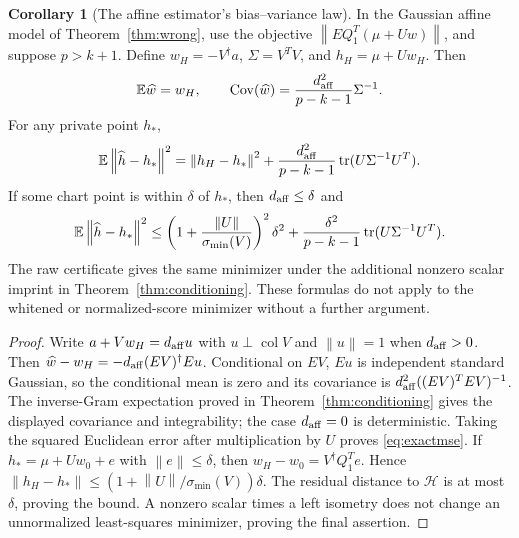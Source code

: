 \documentclass[11pt,a4paper]{article}
\theoremstyle{definition}
\newtheorem{corollary}[theorem]{Corollary}
\theoremstyle{definition}
\theoremstyle{remark}\newtheorem{remark}[theorem]{Remark}
\newcommand{\HH}{\mathcal H}\newcommand{\XX}{\mathcal X}\newcommand{\col}{\operatorname{col}}
\newcommand{\smin}{\sigma_{\min}}\newcommand{\smax}{\sigma_{\max}}
\newcommand{\norm}[1]{\left\lVert #1\right\rVert}
\begin{document}
\begin{corollary}[The affine estimator's bias--variance law]\label{cor:biasvariance}
In the Gaussian affine model of Theorem~\ref{thm:wrong}, use the objective $\norm{EQ_1^T(\mu+Uw)}$, and suppose $p>k+1$. Define $w_H=-V^\dagger a$, $\Sigma=V^TV$, and $h_H=\mu+Uw_H$. Then
\[
\mathbb E\widehat w=w_H,\qquad
\operatorname{Cov}(\widehat w)=\frac{d_{\rm aff}^2}{p-k-1}\Sigma^{-1}.
\]
For any private point $h_*$,
\begin{equation}\label{eq:exactmse}
\E\norm{\widehat h-h_*}^2
=\norm{h_H-h_*}^2+
\frac{d_{\rm aff}^2}{p-k-1}\tr(U\Sigma^{-1}U^T).
\end{equation}
If some chart point is within $\delta$ of $h_*$, then $d_{\rm aff}\le\delta$ and
\[
\E\norm{\widehat h-h_*}^2
\le\left(1+\frac{\norm U}{\smin(V)}\right)^2\delta^2+
\frac{\delta^2}{p-k-1}\tr(U\Sigma^{-1}U^T).
\]
The raw certificate gives the same minimizer under the additional nonzero scalar imprint in Theorem~\ref{thm:conditioning}. These formulas do not apply to the whitened or normalized-score minimizer without a further argument.
\end{corollary}
\begin{proof}
Write $a+Vw_H=d_{\rm aff}u$ with $u\perp\col V$ and $\norm u=1$ when $d_{\rm aff}>0$. Then
$\widehat w-w_H=-d_{\rm aff}(EV)^\dagger Eu$. Conditional on $EV$, $Eu$ is independent standard Gaussian, so the conditional mean is zero and its covariance is $d_{\rm aff}^2((EV)^TEV)^{-1}$. The inverse-Gram expectation proved in Theorem~\ref{thm:conditioning} gives the displayed covariance and integrability; the case $d_{\rm aff}=0$ is deterministic. Taking the squared Euclidean error after multiplication by $U$ proves \eqref{eq:exactmse}. If $h_*=\mu+Uw_0+e$ with $\norm e\le\delta$, then $w_H-w_0=V^\dagger Q_1^Te$. Hence $\norm{h_H-h_*}\le(1+\norm U/\smin(V))\delta$. The residual distance to $\HH$ is at most $\delta$, proving the bound. A nonzero scalar times a left isometry does not change an unnormalized least-squares minimizer, proving the final assertion.
\end{proof}
\end{document}
